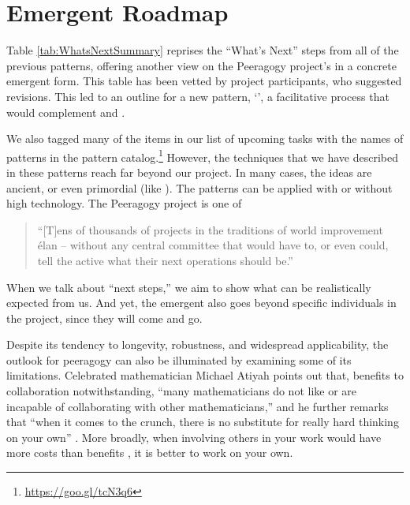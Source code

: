 \section{Emergent Roadmap} \label{sec:Distributed_Roadmap}

Table \ref{tab:WhatsNextSummary} reprises the ``What's Next'' steps
from all of the previous patterns, offering another view on the
Peeragogy project's  in a concrete emergent form.
%
This table has been vetted by project participants, who suggested
revisions.  This led to an outline for a new pattern,
`', a facilitative process that would
complement  and .

We also tagged many of the items in our list of upcoming tasks with the names of
patterns in the pattern catalog.\footnote{\url{https://goo.gl/tcN3q6}}
However, the techniques that we have described in these patterns reach
far beyond our project.  In many cases, the ideas are ancient, or even
primordial (like ).  The patterns can be
applied with or without high technology.  The Peeragogy project is one
of
\begin{quote}
 ``[T]ens of thousands of projects in the traditions of world
improvement \'elan -- without any central committee that would have
to, or even could, tell the active what their next operations should
be.'' \cite[p. 402]{sloterdijk2013change}
\end{quote}
When we talk about ``next steps,'' we aim to show what can be
realistically expected from us.
And yet, the emergent  also goes beyond specific
individuals in the project, since they will come and go.

Despite its tendency to longevity, robustness, and
widespread applicability, the outlook for peeragogy can also be
illuminated by examining some of its limitations.  Celebrated mathematician
Michael Atiyah points out that, benefits to collaboration
notwithstanding, ``many mathematicians do not like or are incapable of
collaborating with other mathematicians,'' and he further remarks that
``when it comes to the crunch, there is no substitute for really hard
thinking on your own'' \cite{atiyah1974research}.
More broadly, when involving others in your work would have more costs
than benefits \cite{coase1937nature}, it is better to work on your
own.

